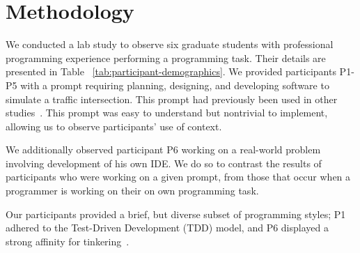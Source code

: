 
\section{Methodology}\label{sec:methodology}


We conducted a lab study to observe six graduate students with professional programming experience performing a programming task. Their details are presented in Table ~\ref{tab:participant-demographics}.
We provided participants P1-P5 with a prompt requiring planning, designing, and developing software to simulate a traffic intersection. This prompt had previously been used in other studies~\cite{Mangano:2012}. This prompt was easy to understand but nontrivial to implement, allowing us to observe participants' use of context. 

We additionally observed participant P6 working on a real-world problem involving development of his own IDE. We do so to contrast the results of participants who were working on a given prompt, from those that occur when a programmer is working on their on own programming task.

\vspace{-10pt}

\vspace{-10pt}
Our participants provided a brief, but diverse subset of programming styles; P1 adhered to the Test-Driven Development (TDD) model, and P6 displayed a strong affinity for tinkering~\cite{Beckwith:2006}. %


